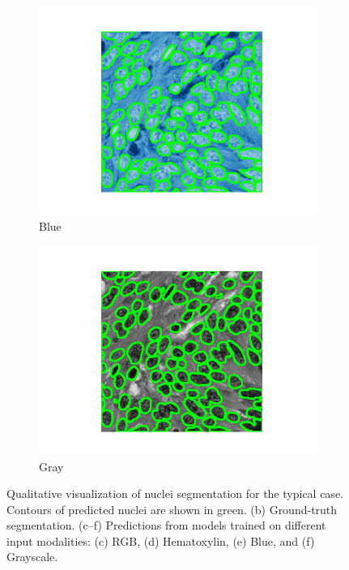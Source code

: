 \documentclass[target=bach,aauheader=,style=]{thud}
\begin{document}
\begin{figure}[!htbp]
\begin{subfigure}{0.48\textwidth}
  \centering
  \includegraphics[width=\linewidth]{imgs/qualitative/medium/Blu/contour_img.png}
  \caption{Blue}
\end{subfigure}\hfill
\begin{subfigure}{0.48\textwidth}
  \centering
  \includegraphics[width=\linewidth]{imgs/qualitative/medium/Gray/contour_img.png}
  \caption{Gray}
\end{subfigure}

\caption{Qualitative visualization of nuclei segmentation for the typical case. 
Contours of predicted nuclei are shown in green. 
(b) Ground-truth segmentation. 
(c--f) Predictions from models trained on different input modalities: (c) RGB, (d) Hematoxylin, (e) Blue, and (f) Grayscale.}
\label{fig:qual_typical}
\end{figure}
\end{document}
